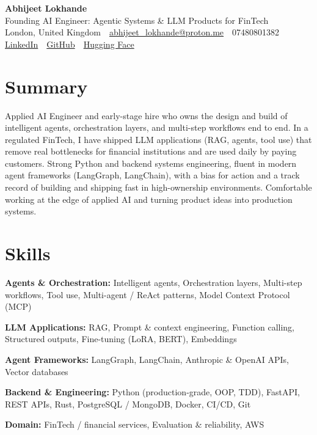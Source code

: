 \documentclass[10pt,a4paper]{article}
\newcommand{\sep}{\,\textcolor{accent!60}{\textbar}\,}
\begin{document}
\begin{center}
  {\fontsize{24}{26}\selectfont\bfseries Abhijeet Lokhande}\\[3pt]
  {\color{accent}\large Founding AI Engineer: Agentic Systems \& LLM Products for FinTech}\\[5pt]
  {\small
    London, United Kingdom \sep
    \href{mailto:abhijeet_lokhande@proton.me}{abhijeet\_lokhande@proton.me} \sep
    07480801382 \\[2pt]
    \href{https://www.linkedin.com/in/ablds/}{LinkedIn} \sep
    \href{https://github.com/abhijeetscode}{GitHub} \sep
    \href{https://huggingface.co/ab-ai}{Hugging Face}
  }
\end{center}
\vspace{2pt}

\section{Summary}
Applied AI Engineer and early-stage hire who owns the design and build of intelligent agents, orchestration layers, and multi-step workflows end to end. In a regulated FinTech, I have shipped LLM applications (RAG, agents, tool use) that remove real bottlenecks for financial institutions and are used daily by paying customers. Strong Python and backend systems engineering, fluent in modern agent frameworks (LangGraph, LangChain), with a bias for action and a track record of building and shipping fast in high-ownership environments. Comfortable working at the edge of applied AI and turning product ideas into production systems.

\section{Skills}
\begin{tight}
  \item[\textcolor{accent}{\small$\bullet$}] \textbf{Agents \& Orchestration:} Intelligent agents, Orchestration layers, Multi-step workflows, Tool use, Multi-agent / ReAct patterns, Model Context Protocol (MCP)
  \item[\textcolor{accent}{\small$\bullet$}] \textbf{LLM Applications:} RAG, Prompt \& context engineering, Function calling, Structured outputs, Fine-tuning (LoRA, BERT), Embeddings
  \item[\textcolor{accent}{\small$\bullet$}] \textbf{Agent Frameworks:} LangGraph, LangChain, Anthropic \& OpenAI APIs, Vector databases
  \item[\textcolor{accent}{\small$\bullet$}] \textbf{Backend \& Engineering:} Python (production-grade, OOP, TDD), FastAPI, REST APIs, Rust, PostgreSQL / MongoDB, Docker, CI/CD, Git
  \item[\textcolor{accent}{\small$\bullet$}] \textbf{Domain:} FinTech / financial services, Evaluation \& reliability, AWS
\end{tight}
\end{document}

